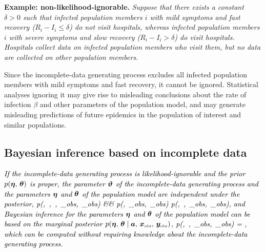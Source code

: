 \documentclass[12pt,usenatbib,referee]{article}
\renewcommand{\alert}{\textcolor{black}}
\begin{document}
{\bf Example: non-likelihood-ignorable.}
{\em Suppose that there exists a constant $\delta > 0$ such that infected population members $i$ with mild symptoms and fast recovery ($R_i - I_i \leq \delta$) do not visit hospitals,
whereas infected population members $i$ with severe symptoms and slow recovery ($R_i - I_i > \delta$) do visit hospitals.
Hospitals collect data on infected population members who visit them,
but no data are collected on other population members.\s
}

Since the incomplete-data generating process excludes all infected population members with mild symptoms and fast recovery,
it cannot be ignored.
Statistical analyses ignoring it may give rise to misleading conclusions about the rate of infection $\beta$ and other parameters of the population model,
and may generate misleading predictions of future epidemics in the population of interest and similar populations.

\subsection{Bayesian inference based on incomplete data}
\label{bayesian.inference}

\alert{}

\vspace{-.85cm}

\alert{
\proposition\label{theorem.2}
{\em If the incomplete-data generating process is likelihood-ignorable and the prior $p(\boldsymbol{\eta},\, \boldsymbol{\theta})$ is proper,
the parameter $\boldsymbol{\vartheta}$ of the incomplete-data generating process and the parameters $\boldsymbol{\eta}$ and $\boldsymbol{\theta}$ of the population model are independent under the posterior,
\bea
\nonumber
\label{result1}
p(\bvartheta,\, \bta,\, \btheta \mid \baa,\, \bx_{\mbox{\tiny obs}},\, \by_{\mbox{\tiny obs}})
&\propto& p(\bvartheta \mid \baa,\, \bx_{\mbox{\tiny obs}},\, \by_{\mbox{\tiny obs}})\; p(\bta,\, \btheta \mid \baa,\, \bx_{\mbox{\tiny obs}},\, \by_{\mbox{\tiny obs}}),
\eea
and Bayesian inference for the parameters $\boldsymbol{\eta}$ and $\boldsymbol{\theta}$ of the population model can be based on the marginal posterior $p(\boldsymbol{\eta},\, \boldsymbol{\theta} \mid \bm{a},\, \bm{x}_{\mbox{\tiny obs}},\, \bm{y}_{\mbox{\tiny obs}})$,
\bea
\label{main.result}
p(\bta,\, \btheta \mid \baa,\, \bx_{\mbox{\tiny obs}},\, \by_{\mbox{\tiny obs}})
= ,
\eea
which can be computed without requiring knowledge about the incomplete-data generating process.}
}
\end{document}
